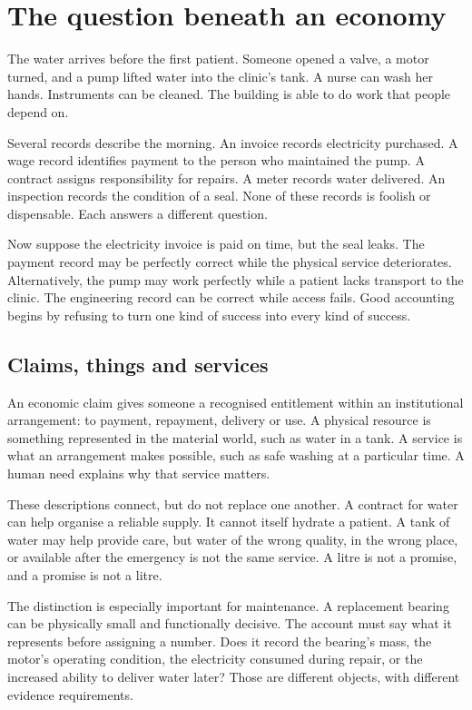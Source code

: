 \chapter{The question beneath an economy}\label{ch:question}

The water arrives before the first patient. Someone opened a valve, a motor turned, and a pump lifted water into the clinic's tank. A nurse can wash her hands. Instruments can be cleaned. The building is able to do work that people depend on.

Several records describe the morning. An invoice records electricity purchased. A wage record identifies payment to the person who maintained the pump. A contract assigns responsibility for repairs. A meter records water delivered. An inspection records the condition of a seal. None of these records is foolish or dispensable. Each answers a different question.

Now suppose the electricity invoice is paid on time, but the seal leaks. The payment record may be perfectly correct while the physical service deteriorates. Alternatively, the pump may work perfectly while a patient lacks transport to the clinic. The engineering record can be correct while access fails. Good accounting begins by refusing to turn one kind of success into every kind of success.

\section{Claims, things and services}
An economic claim gives someone a recognised entitlement within an institutional arrangement: to payment, repayment, delivery or use. A physical resource is something represented in the material world, such as water in a tank. A service is what an arrangement makes possible, such as safe washing at a particular time. A human need explains why that service matters.

These descriptions connect, but do not replace one another. A contract for water can help organise a reliable supply. It cannot itself hydrate a patient. A tank of water may help provide care, but water of the wrong quality, in the wrong place, or available after the emergency is not the same service. A litre is not a promise, and a promise is not a litre.

The distinction is especially important for maintenance. A replacement bearing can be physically small and functionally decisive. The account must say what it represents before assigning a number. Does it record the bearing's mass, the motor's operating condition, the electricity consumed during repair, or the increased ability to deliver water later? Those are different objects, with different evidence requirements.

